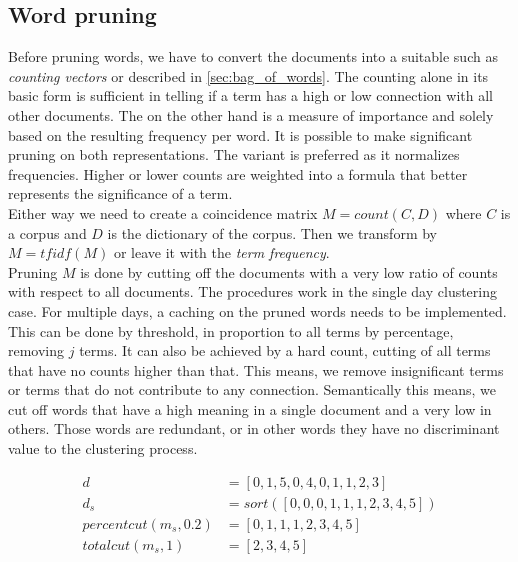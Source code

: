   \subsection{Word pruning}
  \label{sec:word_pruning}

    Before pruning words, we have to convert the documents into a suitable \vsm{} such as \emph{counting vectors} or \tfidf{} described in \ref{sec:bag_of_words}. The counting alone in its basic form is sufficient in telling if a term has a high or low connection with all other documents. The \tfidf{} on the other hand is a measure of importance and solely based on the resulting frequency per word. It is possible to make significant pruning on both representations. The \tfidf{} variant is preferred as it normalizes frequencies. Higher or lower counts are weighted into a formula that better represents the significance of a term.\\

    Either way we need to create a coincidence matrix $M = count(C, D)$ where $C$ is a corpus and $D$ is the dictionary of the corpus. Then we transform by $M = tfidf(M)$ or leave it with the \emph{term frequency}.\\

    Pruning $M$ is done by cutting off the documents with a very low ratio of counts with respect to all documents. The procedures work in the single day clustering case. For multiple days, a caching on the pruned words needs to be implemented. This can be done by threshold, in proportion to all terms by percentage, removing $j$ terms. It can also be achieved by a hard count, cutting of all terms that have no counts higher than that. This means, we remove insignificant terms or terms that do not contribute to any connection. Semantically this means, we cut off words that have a high meaning in a single document and a very low in others. Those words are redundant, or in other words they have no discriminant value to the clustering process.

      \begin{equation}\label{min_cut}
      \begin{split}
        d &= [0, 1, 5, 0, 4, 0, 1, 1, 2, 3] \\
        d_s &= sort( [0, 0, 0, 1, 1, 1, 2, 3, 4, 5] ) \\
        percentcut(m_s, 0.2) &= [0, 1, 1, 1, 2, 3, 4, 5] \\
        totalcut(m_s, 1) &= [2, 3, 4, 5]
      \end{split}
      \end{equation}

